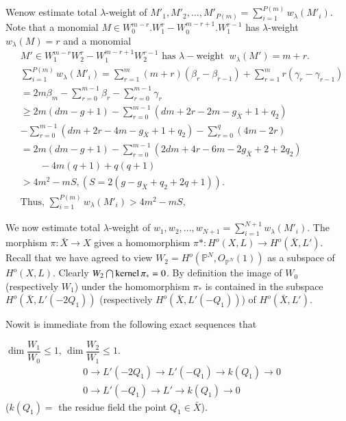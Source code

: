 {\noindent 
We\pageoriginale now estimate total $\lambda$-weight of $M'_{1},
M'_{2}, \ldots , 
M'_{P(m)}  = \sum\limits^{P(m)}_{i=1} w_{\lambda}(M'_{i})$. Note that a
monomial $M \in W^{m-r}_{0}. W^{r}_{1} -
W^{m-r+1}_{0}. W^{r-1}_{1}$ has $\lambda$-weight $w_{\lambda}(M) = r$
and a monomial   
\begin{align*}
& M' \in W^{m-r}_{1} W^{r}_{2}- W^{m-r+1}_{1} W^{r-1}_{2}
  \text{ has } \lambda-\text{weight } ~ w_{\lambda} (M') = m+r. \\ 
&\sum\limits^{P(m)}_{i=1} w_{\lambda}(M'_{i}) = \sum^{m}_{r=1} (m+r)
  (\beta_{r} - \beta_{r-1}) + \sum^{m}_{r=1}  r(\gamma_{r} -
  \gamma_{r-1}) \\ 
&= 2m\beta_{m} - \sum^{m-1}_{r=0} \beta_{r} - \sum^{m-1}_{r=0} \gamma_{r}  \\
&\ge 2m(dm-g+1) - \sum^{m-1}_{r=0} (dm+2r-2m-g_{\bar{X}} + 1 +
  q_{2})\\ 
&- \sum^{m-1}_{r=0} (dm+2r-4m-g_{\bar{X}} + 1 + q_{2}) -
  \sum^{q}_{r=0} (4m-2r)\\ 
&= 2m (dm -g +1) - \sum\limits^{m-1}_{r=0} (2dm+4r-6m-2g_{\bar{X}} + 2
  +2 q_{2})\\ 
&\qquad - 4m (q+1) + q (q+1)\\ 
&> 4m^{2} - mS, (S = 2(g - g_{\bar{X}} + q_{2} + 2q + 1)). \\
& \text{Thus, } \sum\limits^{P(m)}_{i=1} w_{\lambda}(M'_{i})  > 4m^{2} -
mS,\tag{$E_1$} 
\end{align*}

\noindent
We now estimate total $\lambda$-weight of $w_{1}, w_{2}, \ldots,
w_{N+1} =  
\sum\limits^{N+1}_{i=1} w_{\lambda}(M'_{i})$. The morphism $\pi :
\bar{X} \to X$ gives a homomorphism $\pi * : H^o (X, L) \to H^o
(\bar{X} , L')$. Recall that we have agreed to view $W_{2} = H^o
(\mathbb{P}^{N} , O_{\mathbb{P}^{N}} (1))$ as a subspace of $H^o (X
, L)$. Clearly $W_{2} \bigcap \operatorname{kernel} \pi_{*} = 0$. By definition the
image of $W_{0}$ (respectively $W_{1}$) under the homomorphism
$\pi_{*}$ is contained in the subspace $H^o (\bar{X}, L'(-2Q
_{1}))$ (respectively $H^o (\bar{X}, L' (-Q_{1}))$) of $H^o
(\bar{X}, L')$.  

\noindent
Now\pageoriginale it is immediate from the following exact sequences
that  

\noindent
 $\dim \dfrac{W_{1}}{W_{0}} \le 1$, $\dim \dfrac{W_{2}}{W_{1}} \le 1$.
\begin{align*}
& 0 \to L'(-2Q_{1}) \to L' (-Q_{1}) \to k(Q_{1}) \to 0\\
& 0 \to L'(-Q_{1}) \to L'   \to k(Q_{1}) \to 0
\end{align*}
($k(Q_{1}) = $ the residue field the point $Q_{1} \in \bar{X}$). 

}
